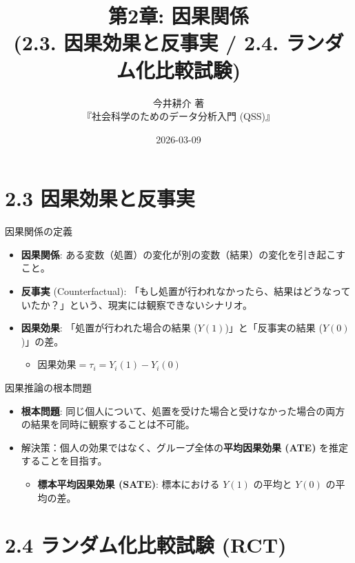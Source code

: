 \documentclass[
  ignorenonframetext,
]{beamer}
\title{第2章: 因果関係\\
(2.3. 因果効果と反事実 / 2.4. ランダム化比較試験)}
\subtitle{今井耕介 著\\
『社会科学のためのデータ分析入門 (QSS)』}
\author{}
\date{\vspace{-2.5em}2026-03-09}
\providecommand{\tightlist}{%
  \setlength{\itemsep}{0pt}\setlength{\parskip}{0pt}}
\begin{document}
\frame{\titlepage}

\hypertarget{ux56e0ux679cux52b9ux679cux3068ux53cdux4e8bux5b9f}{%
\section{2.3
因果効果と反事実}\label{ux56e0ux679cux52b9ux679cux3068ux53cdux4e8bux5b9f}}

\begin{frame}{因果関係の定義}
\protect\hypertarget{ux56e0ux679cux95a2ux4fc2ux306eux5b9aux7fa9}{}
\begin{itemize}
\tightlist
\item
  \textbf{因果関係}:
  ある変数（処置）の変化が別の変数（結果）の変化を引き起こすこと。
\item
  \textbf{反事実} (Counterfactual):
  「もし処置が行われなかったら、結果はどうなっていたか？」という、現実には観察できないシナリオ。
\item
  \textbf{因果効果}: 「処置が行われた場合の結果
  (\(Y(1)\))」と「反事実の結果 (\(Y(0)\))」の差。

  \begin{itemize}
  \tightlist
  \item
    \(\text{因果効果} = \tau_i = Y_i(1) - Y_i(0)\)
  \end{itemize}
\end{itemize}
\end{frame}

\begin{frame}{因果推論の根本問題}
\protect\hypertarget{ux56e0ux679cux63a8ux8ad6ux306eux6839ux672cux554fux984c}{}
\begin{itemize}
\tightlist
\item
  \textbf{根本問題}:
  同じ個人について、処置を受けた場合と受けなかった場合の両方の結果を同時に観察することは不可能。
\item
  解決策：個人の効果ではなく、グループ全体の\textbf{平均因果効果 (ATE)}
  を推定することを目指す。

  \begin{itemize}
  \tightlist
  \item
    \textbf{標本平均因果効果 (SATE)}: 標本における \(Y(1)\) の平均と
    \(Y(0)\) の平均の差。
  \end{itemize}
\end{itemize}
\end{frame}

\hypertarget{ux30e9ux30f3ux30c0ux30e0ux5316ux6bd4ux8f03ux8a66ux9a13-rct}{%
\section{2.4 ランダム化比較試験
(RCT)}\label{ux30e9ux30f3ux30c0ux30e0ux5316ux6bd4ux8f03ux8a66ux9a13-rct}}
\end{document}
